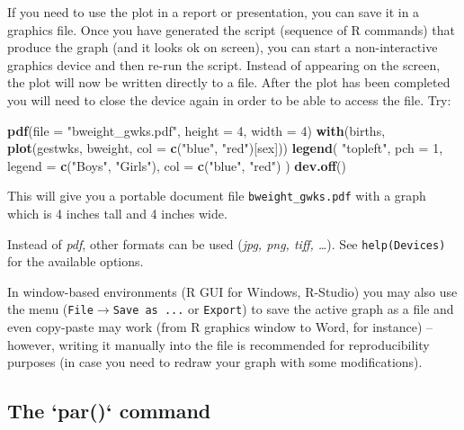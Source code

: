 \documentclass[
]{book}
\newenvironment{Shaded}{\begin{snugshade}}{\end{snugshade}}
\newcommand{\AttributeTok}[1]{\textcolor[rgb]{0.13,0.29,0.53}{#1}}
\newcommand{\DecValTok}[1]{\textcolor[rgb]{0.00,0.00,0.81}{#1}}
\newcommand{\FunctionTok}[1]{\textcolor[rgb]{0.13,0.29,0.53}{\textbf{#1}}}
\newcommand{\NormalTok}[1]{#1}
\newcommand{\StringTok}[1]{\textcolor[rgb]{0.31,0.60,0.02}{#1}}
\begin{document}
If you need to use the plot in a report or presentation, you can save it in a graphics file.
Once you have generated the script (sequence of R commands) that produce the graph (and it looks ok on screen),
you can start a non-interactive graphics device and then re-run the script.
Instead of appearing on the screen, the plot will now be written
directly to a file. After the plot has been completed you will need
to close the device again in order to be able to access the file. Try:

\begin{Shaded}
\begin{Highlighting}[]
\FunctionTok{pdf}\NormalTok{(}\AttributeTok{file =} \StringTok{"bweight\_gwks.pdf"}\NormalTok{, }\AttributeTok{height =} \DecValTok{4}\NormalTok{, }\AttributeTok{width =} \DecValTok{4}\NormalTok{)}
\FunctionTok{with}\NormalTok{(births, }\FunctionTok{plot}\NormalTok{(gestwks, bweight, }\AttributeTok{col =} \FunctionTok{c}\NormalTok{(}\StringTok{"blue"}\NormalTok{, }\StringTok{"red"}\NormalTok{)[sex]))}
\FunctionTok{legend}\NormalTok{(}
  \StringTok{"topleft"}\NormalTok{, }
  \AttributeTok{pch =} \DecValTok{1}\NormalTok{, }
  \AttributeTok{legend =} \FunctionTok{c}\NormalTok{(}\StringTok{"Boys"}\NormalTok{, }\StringTok{"Girls"}\NormalTok{), }
  \AttributeTok{col =} \FunctionTok{c}\NormalTok{(}\StringTok{"blue"}\NormalTok{, }\StringTok{"red"}\NormalTok{)}
\NormalTok{)}
\FunctionTok{dev.off}\NormalTok{()}
\end{Highlighting}
\end{Shaded}

This will give you a portable document file \texttt{bweight\_gwks.pdf} with a graph
which is 4 inches tall and 4 inches wide.

Instead of \emph{pdf}, other formats can be used (\emph{jpg, png, tiff, \ldots{}}). See \texttt{help(Devices)} for the available options.

In window-based environments (R GUI for Windows, R-Studio) you may also use the menu
(\texttt{File}\(\rightarrow\)\texttt{Save\ as\ ...} or \texttt{Export}) to save the active graph as a file and even copy-paste may work (from R graphics window to Word, for instance) -- however, writing it manually into the file is recommended for reproducibility purposes (in case you need to redraw your graph with some modifications).

\subsection{The `par()` command}
\end{document}
